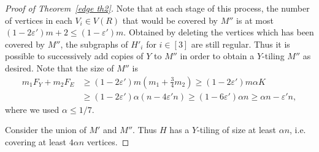 \documentclass[11pt, reqno]{amsart}    	%
\theoremstyle{definition}
\def\eps{\varepsilon}
\numberwithin{equation}{section}
\begin{document}
\begin{proof}[Proof of Theorem~\ref{edge th2}]
		Note that at each stage of this process, the number of vertices in each $V_i\in V(R)$ that would be covered by $M''$ is at most
		$(1-2\varepsilon')m+2\le (1-\varepsilon')m $.	Obtained by deleting the vertices which has been covered by $M''$,  the subgraphs of $H'_{i}$ for $i\in [3]$ are still regular. 
		Thus %
		it is possible to successively add copies of $ Y$ to $M''$ in order to obtain a $Y$-tiling $M''$ as desired.
		Note that the size of $M''$ is 
		\[\begin{split}
			{m_1} F_{Y} + {m_2} F_{E}&\ge (1-2\varepsilon')m(m_1+\frac{3}{4}m_2)\ge (1-2\varepsilon')m\alpha K\\&\ge (1-2\varepsilon')\alpha (n-4\varepsilon' n)\ge(1-6\eps')\alpha n\ge \alpha n-\varepsilon' n,\end{split}\] where we used $ \alpha \le 1/7 $.

Consider the union  of $ M' $ and $ M'' $.	Thus $H$ has a $Y$-tiling of size at least $ \alpha n$, i.e. covering  at least  $ 4\alpha n$ vertices.
	\end{proof}
	
\end{document}
